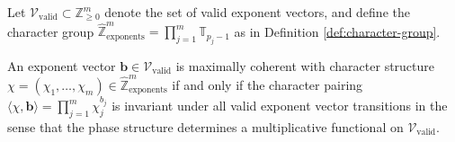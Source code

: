 \begin{theorem}
\label{thm:coherence-eigenvalue}
Let $\mathcal{V}_{\text{valid}} \subset \mathbb{Z}^m_{\geq 0}$ denote the set of valid exponent vectors, and define the character group $\hat{\mathbb{Z}}^m_{\text{exponents}} = \prod_{j=1}^m \mathbb{T}_{p_j-1}$ as in Definition \ref{def:character-group}.

An exponent vector $\mathbf{b} \in \mathcal{V}_{\text{valid}}$ is maximally coherent with character structure $\chi = (\chi_1, \ldots, \chi_m) \in \hat{\mathbb{Z}}^m_{\text{exponents}}$ if and only if the character pairing $\langle \chi, \mathbf{b} \rangle = \prod_{j=1}^m \chi_j^{b_j}$ is invariant under all valid exponent vector transitions in the sense that the phase structure determines a multiplicative functional on $\mathcal{V}_{\text{valid}}$.
\end{theorem}

